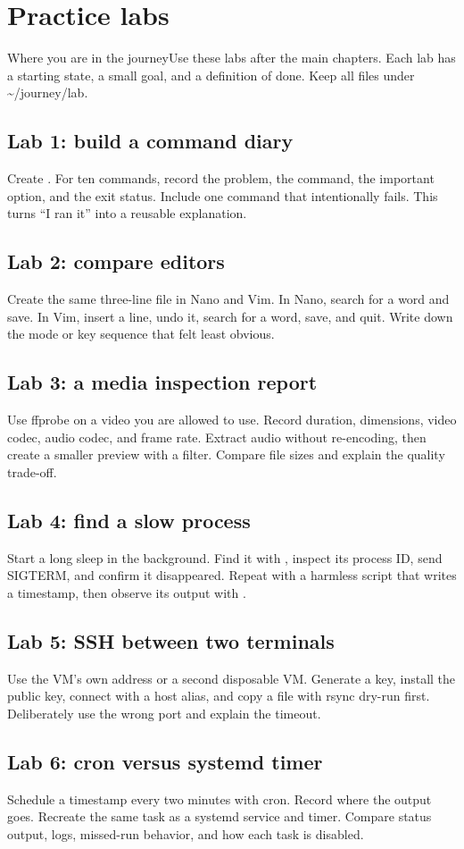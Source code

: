 \documentclass[11pt,a4paper,openany]{book}
\newcommand{\command}[1]{\texttt{\small\detokenize{#1}}}
\newcommand{\lesson}[1]{\begin{mentalbox}{Where you are in the journey}#1\end{mentalbox}}
\begin{document}
\chapter{Practice labs}
\lesson{Use these labs after the main chapters. Each lab has a starting state, a small goal, and a definition of done. Keep all files under \textasciitilde/journey/lab.}
\section{Lab 1: build a command diary}
Create \command{notes/commands.md}. For ten commands, record the problem, the command, the important option, and the exit status. Include one command that intentionally fails. This turns ``I ran it'' into a reusable explanation.
\section{Lab 2: compare editors}
Create the same three-line file in Nano and Vim. In Nano, search for a word and save. In Vim, insert a line, undo it, search for a word, save, and quit. Write down the mode or key sequence that felt least obvious.
\section{Lab 3: a media inspection report}
Use ffprobe on a video you are allowed to use. Record duration, dimensions, video codec, audio codec, and frame rate. Extract audio without re-encoding, then create a smaller preview with a filter. Compare file sizes and explain the quality trade-off.
\section{Lab 4: find a slow process}
Start a long sleep in the background. Find it with \command{ps}, inspect its process ID, send SIGTERM, and confirm it disappeared. Repeat with a harmless script that writes a timestamp, then observe its output with \command{tail -f}.
\section{Lab 5: SSH between two terminals}
Use the VM's own address or a second disposable VM. Generate a key, install the public key, connect with a host alias, and copy a file with rsync dry-run first. Deliberately use the wrong port and explain the timeout.
\section{Lab 6: cron versus systemd timer}
Schedule a timestamp every two minutes with cron. Record where the output goes. Recreate the same task as a systemd service and timer. Compare status output, logs, missed-run behavior, and how each task is disabled.
\end{document}
